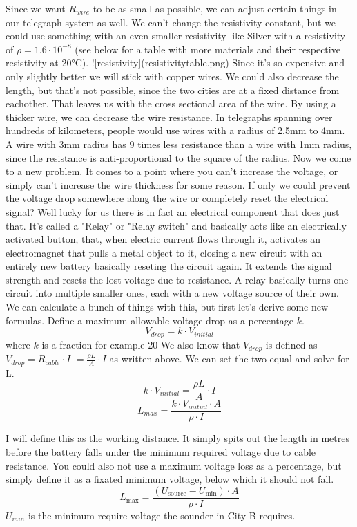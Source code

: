Since we want $R_{wire}$ to be as small as possible, we can adjust certain things in our telegraph system as well. We can't change the resistivity constant, but we could use something with an even smaller resistivity like Silver with a resistivity of $\rho = 1.6\cdot 10^{-8}$ (see below for a table with more materials and their respective resistivity at 20°C). ![resistivity](resistivitytable.png)
Since it's so expensive and only slightly better we will stick with copper wires. We could also decrease the length, but that's not possible, since the two cities are at a fixed distance from eachother. That leaves us with the cross sectional area of the wire. By using a thicker wire, we can decrease the wire resistance. In telegraphs spanning over hundreds of kilometers, people would use wires with a radius of 2.5mm to 4mm. A wire with 3mm radius has 9 times less resistance than a wire with 1mm radius, since the resistance is anti-proportional to the square of the radius. 
Now we come to a new problem. It comes to a point where you can't increase the voltage, or simply can't increase the wire thickness for some reason. If only we could prevent the voltage drop somewhere along the wire or completely reset the electrical signal? Well lucky for us there is in fact an electrical component that does just that. It's called a "Relay" or "Relay switch" and basically acts like an electrically activated button, that, when electric current flows through it, activates an electromagnet that pulls a metal object to it, closing a new circuit with an entirely new battery basically reseting the circuit again. It extends the signal strength and resets the lost voltage due to resistance. A relay basically turns one circuit into multiple smaller ones, each with a new voltage source of their own.
We can calculate a bunch of things with this, but first let's derive some new formulas.
Define a maximum allowable voltage drop as a percentage $k$. 
\[
V_{drop}=k\cdot V_{initial}
\]
where $k$ is a fraction for example 20%
We also know that $V_{drop}$ is defined as 
$V_{drop}=R_{cable}\cdot I$ 
$=\frac{\rho L}{A} \cdot I$
as written above. We can set the two equal and solve for L.
\[
k\cdot V_{initial}=\frac{\rho L}{A}\cdot I
\]
\[
L_{max}=\frac{k\cdot V_{initial} \cdot A}{\rho \cdot I}
\]

I will define this as the working distance. It simply spits out the length in metres before the battery falls under the minimum required voltage due to cable resistance. You could also not use a maximum voltage loss as a percentage, but simply define it as a fixated minimum voltage, below which it should not fall.
\[
L_{\text{max}} = \frac{(U_{\text{source}} - U_{\text{min}}) \cdot A}{\rho \cdot I}
\]
$U_{min}$ is the minimum require voltage the sounder in City B requires. 

